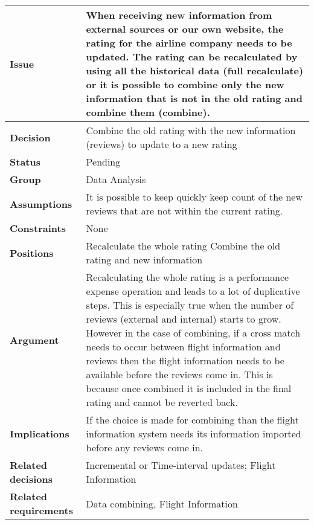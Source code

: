 
\begin{tabular}{ l  p{10cm}}
\hline
\bf Issue & When receiving new information from external sources or our own website, the rating for the airline company needs to be updated. The rating can be recalculated by using all the historical data (full recalculate) or it is possible to combine only the new information that is not in the old rating and combine them (combine). \\
\hline
\bf Decision & Combine the old rating with the new information (reviews) to update to a new rating\\
\hline
\bf Status & Pending\\
\hline
\bf Group & Data Analysis \\
\hline
\bf Assumptions & It is possible to keep quickly keep count of the new reviews that are not within the current rating. \\
\hline
\bf Constraints & None\\
\hline
\bf Positions & Recalculate the whole rating \newline\newline
Combine the old rating and new information
\\
\hline
\bf Argument & Recalculating the whole rating is a performance expense operation and leads to a lot of duplicative steps. This is especially true when the number of reviews (external and internal) starts to grow. However in the case of combining, if a cross match needs to occur between flight information and reviews then the flight information needs to be available before the reviews come in. This is because once combined it is included in the final rating and cannot be reverted back. \\
\hline
\bf Implications & If the choice is made for combining than the flight information system needs its information imported before any reviews come in. \\
\hline
\bf Related decisions & Incremental or Time-interval updates; Flight Information \\
\hline
\bf Related requirements  & Data combining, Flight Information\\
\hline
\end{tabular}

